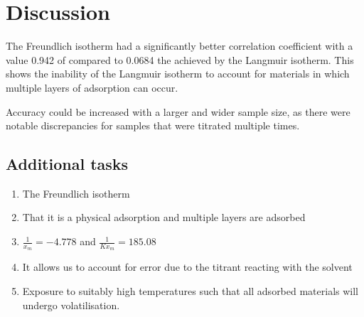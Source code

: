 \documentclass[a4paper, british]{article}
\begin{document}
\section{Discussion}

The Freundlich isotherm had a significantly better correlation coefficient with a value 0.942 of compared to 0.0684 the achieved by the Langmuir isotherm. This shows the inability of the Langmuir isotherm to account for materials in which multiple layers of adsorption can occur. 

Accuracy could be increased with a larger and wider sample size, as there were notable discrepancies for samples that were titrated multiple times.

\newpage

\begin{appendices}

\section{Additional tasks}

\begin{enumerate}
    \item The Freundlich isotherm
    \item That it is a physical adsorption and multiple layers are adsorbed 
    \item \(\frac{1}{x_m} = -4.778\) and \(\frac{1}{Kx_m} = 185.08\)
    \item It allows us to account for error due to the titrant reacting with the solvent
    \item Exposure to suitably high temperatures such that all adsorbed materials will undergo volatilisation.
\end{enumerate}

\newpage




\end{appendices}
\end{document}
